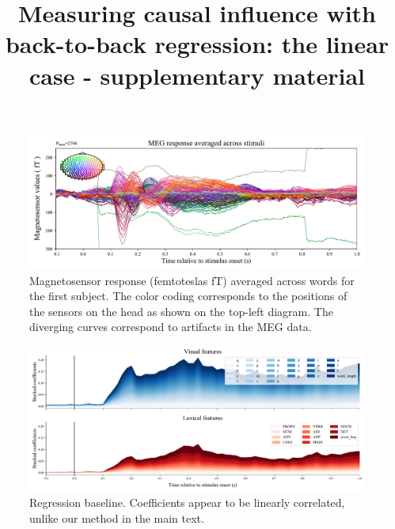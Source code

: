 \documentclass{article}
\title{Measuring causal influence with\\ back-to-back regression: the linear case - supplementary material}
\begin{document}
\maketitle

\begin{figure}[h]
  \centering
  \includegraphics[width=\textwidth, trim=0cm 0cm 0cm 0cm, clip=True]{figures/meg_sensors.pdf}
  \caption{Magnetosensor response (femtoteslas fT) averaged across words for the first subject. The color coding corresponds to the positions of the sensors on the head as shown on the top-left diagram. The diverging curves correspond to artifacts in the MEG data.}
  \label{fig:megavg}
\end{figure}


\begin{figure}[h]
  \centering
  \includegraphics[width=\textwidth, trim=0cm 0cm 0cm 0cm, clip=True]{figures/ridgecv_baseline_result.pdf}
  \caption{Regression baseline. Coefficients appear to be
  linearly correlated, unlike our method in the main text.}
  \label{fig:ridgebaselineresult}
\end{figure}
\end{document}
